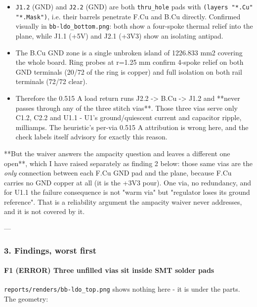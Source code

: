 \documentclass[11pt,a4paper]{article}
\begin{document}
\begin{itemize}
\item \texttt{J1.2} (GND) and \texttt{J2.2} (GND) are both \texttt{thru\_hole} pads with
\texttt{(layers "{*}.Cu" "{*}.Mask")}, i.e. their barrels penetrate F.Cu and B.Cu
directly. Confirmed visually in \texttt{bb-ldo\_bottom.png}: both show a four-spoke
thermal relief into the plane, while J1.1 (+5V) and J2.1 (+3V3) show an
isolating antipad.
\item The B.Cu GND zone is a single unbroken island of 1226.833 mm2 covering the
whole board. Ring probes at r=1.25 mm confirm 4-spoke relief on both GND
terminals (20/72 of the ring is copper) and full isolation on both rail
terminals (72/72 clear).
\item Therefore the 0.515 A load return runs J2.2 -\textgreater{} B.Cu -\textgreater{} J1.2 and {*}{*}never
passes through any of the three stitch vias{*}{*}. Those three vias serve only
C1.2, C2.2 and U1.1 - U1's ground/quiescent current and capacitor ripple,
milliamps. The heuristic's per-via 0.515 A attribution is wrong here, and
the check labels itself advisory for exactly this reason.
\end{itemize}
{*}{*}But the waiver answers the ampacity question and leaves a different one open{*}{*}, which I have raised separately as finding 2 below: those same vias are the \emph{only} connection between each F.Cu GND pad and the plane, because F.Cu carries no GND copper at all (it is the +3V3 pour). One via, no redundancy, and for U1.1 the failure consequence is not "warm via" but "regulator loses its ground reference". That is a reliability argument the ampacity waiver never addresses, and it is not covered by it.

---

\subsubsection*{3. Findings, worst first}
\paragraph*{F1 (ERROR) Three unfilled vias sit inside SMT solder pads}
\texttt{reports/renders/bb-ldo\_top.png} shows nothing here - it is under the parts. The geometry:
\end{document}
